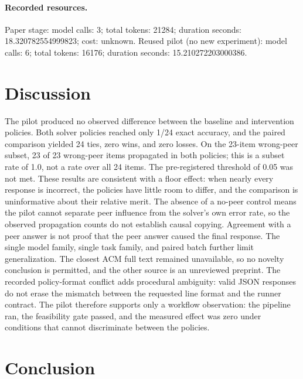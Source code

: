 \documentclass{article}
\begin{document}
\paragraph{Recorded resources.}Paper stage: model calls: 3; total tokens: 21284; duration seconds: 18.320782554999823; cost: unknown. Reused pilot (no new experiment): model calls: 6; total tokens: 16176; duration seconds: 15.210272203000386.

\section{Discussion}

The pilot produced no observed difference between the baseline and intervention policies. Both solver policies reached only 1/24 exact accuracy, and the paired comparison yielded 24 ties, zero wins, and zero losses. On the 23-item wrong-peer subset, 23 of 23 wrong-peer items propagated in both policies; this is a subset rate of 1.0, not a rate over all 24 items. The pre-registered threshold of 0.05 was not met. These results are consistent with a floor effect: when nearly every response is incorrect, the policies have little room to differ, and the comparison is uninformative about their relative merit. The absence of a no-peer control means the pilot cannot separate peer influence from the solver's own error rate, so the observed propagation counts do not establish causal copying. Agreement with a peer answer is not proof that the peer answer caused the final response. The single model family, single task family, and paired batch further limit generalization. The closest ACM full text remained unavailable, so no novelty conclusion is permitted, and the other source is an unreviewed preprint. The recorded policy-format conflict adds procedural ambiguity: valid JSON responses do not erase the mismatch between the requested line format and the runner contract. The pilot therefore supports only a workflow observation: the pipeline ran, the feasibility gate passed, and the measured effect was zero under conditions that cannot discriminate between the policies.

\section{Conclusion}
\end{document}
